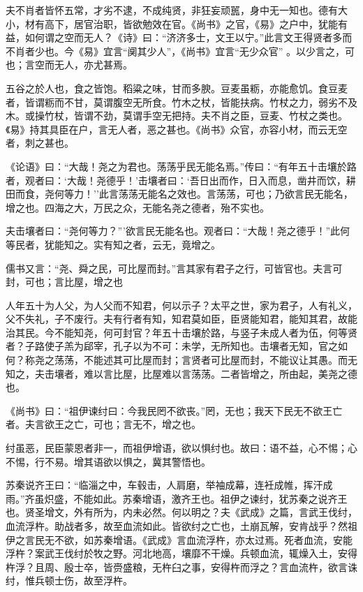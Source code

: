 \documentclass[]{article}
\begin{document}
夫不肖者皆怀五常，才劣不逮，不成纯贤，非狂妄顽嚚，身中无一知也。德有大小，材有高下，居官治职，皆欲勉效在官。《尚书》之官，《易》之户中，犹能有益，如何谓之空而无人？《诗》曰：``济济多士，文王以宁。''此言文王得贤者多而不肖者少也。今《易》宜言``阒其少人''，《尚书》宜言``无少众官''
。以少言之，可也；言空而无人，亦尤甚焉。

五谷之於人也，食之皆饱。稻粱之味，甘而多腴。豆麦虽粝，亦能愈饥。食豆麦者，皆谓粝而不甘，莫谓腹空无所食。竹木之杖，皆能扶病。竹杖之力，弱劣不及木。或操竹杖，皆谓不劲，莫谓手空无把持。夫不肖之臣，豆麦、竹杖之类也。《易》持其具臣在户，言无人者，恶之甚也。《尚书》众官，亦容小材，而云无空者，刺之甚也。

《论语》曰：``大哉！尧之为君也。荡荡乎民无能名焉。''传曰：``有年五十击壤於路者，观者曰：`大哉！尧德乎！'击壤者曰：`吾日出而作，日入而息，凿井而饮，耕田而食，尧何等力！''此言荡荡无能名之效也。言荡荡，可也；乃欲言民无能名，增之也。四海之大，万民之众，无能名尧之德者，殆不实也。

夫击壤者曰：``尧何等力？'''欲言民无能名也。观者曰：``大哉！尧之德乎！''此何等民者，犹能知之。实有知之者，云无，竟增之。

儒书又言：``尧、舜之民，可比屋而封。''言其家有君子之行，可皆官也。夫言可封，可也；言比屋，增之也

人年五十为人父，为人父而不知君，何以示子？太平之世，家为君子，人有礼义，父不失礼，子不废行。夫有行者有知，知君莫如臣，臣贤能知君，能知其君，故能治其民。今不能知尧，何可封官？年五十击壤於路，与竖子未成人者为伍，何等贤者？子路使子羔为郈宰，孔子以为不可：未学，无所知也。击壤者无知，官之如何？称尧之荡荡，不能述其可比屋而封；言贤者可比屋而封，不能议让其愚。而无知之，夫击壤者，难以言比屋，比屋难以言荡荡。二者皆增之，所由起，美尧之德也。

《尚书》曰：``祖伊谏纣曰：今我民罔不欲丧。''罔，无也；我天下民无不欲王亡者。夫言欲王之亡，可也；言无不，增之也。

纣虽恶，民臣蒙恩者非一，而祖伊增语，欲以惧纣也。故曰：语不益，心不惕；心不惕，行不易。增其语欲以惧之，冀其警悟也。

苏秦说齐王曰：``临淄之中，车毂击，人肩磨，举袖成幕，连衽成帷，挥汗成雨。''齐虽炽盛，不能如此。苏秦增语，激齐王也。祖伊之谏纣，犹苏秦之说齐王也。贤圣增文，外有所为，内未必然。何以明之？夫《武成》之篇，言武王伐纣，血流浮杵。助战者多，故至血流如此。皆欲纣之亡也，土崩瓦解，安肯战乎？然祖伊之言民无不欲，如苏秦增语。《武成》言血流浮杵，亦太过焉。死者血流，安能浮杵？案武王伐纣於牧之野。河北地高，壤靡不干燥。兵顿血流，辄燥入土，安得杵浮？且周、殷士卒，皆赍盛粮，无杵臼之事，安得杵而浮之？言血流杵，欲言诛纣，惟兵顿士伤，故至浮杵。
\end{document}

